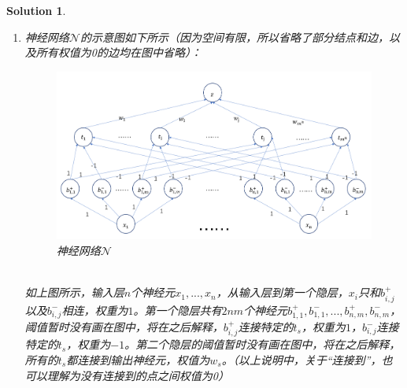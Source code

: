 \documentclass[a4paper,UTF8]{article}
\numberwithin{equation}{section}
\newtheorem*{solution}{Solution}
\begin{document}
\begin{solution}

\begin{enumerate}[ {(}1{)}]
\item 神经网络$\mathcal{N}$的示意图如下所示（因为空间有限，所以省略了部分结点和边，以及所有权值为0的边均在图中省略）：
\begin{figure}[!h]
	\centering   
	\includegraphics[scale=0.5]{net.png}  
	\caption{神经网络$\mathcal{N}$} 
	\label{net}
\end{figure}\\
如上图所示，输入层$n$个神经元$x_1,...,x_n$，从输入层到第一个隐层，$x_i$只和$b_{i,j}^+$以及$b_{i,j}^-$相连，权重为$1$。第一个隐层共有$2nm$个神经元$b_{1,1}^+,b_{1,1}^-,...,b_{n,m}^+,b_{n,m}^-$，阈值暂时没有画在图中，将在之后解释，$b_{i,j}^+$连接特定的$t_s$，权重为$1$，$b_{i,j}^-$连接特定的$t_s$，权重为$-1$。第二个隐层的阈值暂时没有画在图中，将在之后解释，所有的$t_s$都连接到输出神经元，权值为$w_s$。（以上说明中，关于“连接到”，也可以理解为没有连接到的点之间权值为0）\\
	

\end{enumerate}
\end{solution}
\end{document}
